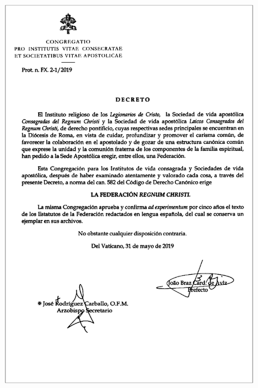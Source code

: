 ﻿\documentclass{book}
\begin{document}
\begin{figure}
\begin{center}
\includegraphics[height=\textheight]{dekret-powolanie-federacji-rc}
\end{center}
\end{figure}
\end{document}
